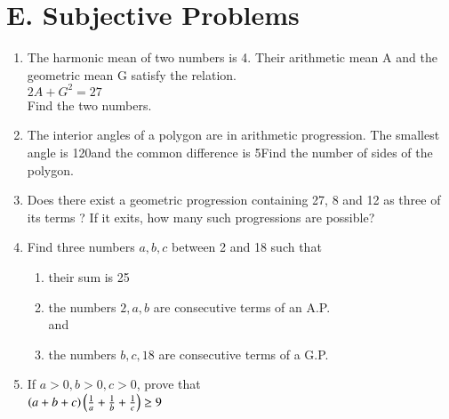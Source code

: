 \documentclass[journal,12pt,twocolumn]{IEEEtran}
\theoremstyle{remark}
\begin{document}
\section*{E. Subjective Problems}
\begin{enumerate}
    \item The harmonic mean of two numbers is 4. Their arithmetic mean A and the geometric mean G satisfy the relation.
    \\
    $2A + G^2 = 27$
    \\
    Find the two numbers.  \hfill{}

\item The interior angles of a polygon are in arithmetic progression. The smallest angle is 120\degree and the common difference is 5\degree Find the number of sides of the polygon. \hfill{}

    \item Does there exist a geometric progression containing 27, 8 and 12 as three of its terms ? If it exits, how many such progressions are possible?  \hfill{}

    \item Find three numbers $a,b,c$ between 2 and 18 such that
    \begin{enumerate}
    \item their sum is 25
    \item the numbers $2,a,b$ are consecutive terms of an A.P.
    \\
    and
    \item the numbers $b,c,18$ are consecutive terms of a G.P.\hfill{}
    \end{enumerate}
  

    \item If $a>0,b>0,c>0$, prove that
    \\
    $\left(a+b+c\right)\left(\frac{1}{a}+\frac{1}{b}+\frac{1}{c}\right)\geq9$
    \hfill{}

\end{enumerate}
\end{document}
